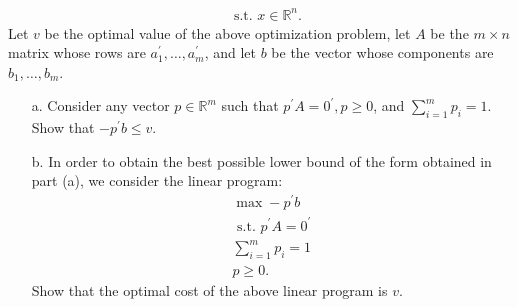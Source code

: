 \documentclass{article}
\begin{document}
\begin{jacklist}
\begin{framed}
\begin{align*}
            & \text { s.t. } x \in \mathbb{R}^{n} .
        \end{align*} Let $v$ be the optimal value of the above optimization problem, let $A$ be the $m \times n$ matrix whose 
        rows are $a_{1}^{\prime}, \ldots, a_{m}^{\prime}$, and let $b$ be the vector whose components are $b_{1}, \ldots, b_{m}$.
        \begin{itemize}
            \item [a.] Consider any vector $p \in \mathbb{R}^{m}$ such that $p^{\prime} A=0^{\prime}, p \geq 0$, and 
                $\sum_{i=1}^{m} p_{i}=1$. Show that $-p^{\prime} b \leq v$.
            \item [b.] In order to obtain the best possible lower bound of the form obtained in part (a), we consider the linear program:
                \begin{align*}
                    \max -p^{\prime} b \\
                    \text { s.t. } p^{\prime} A=0^{\prime} \\
                    \sum_{i=1}^{m} p_{i}=1 \\
                    p \geq 0.
                \end{align*} 
                Show that the optimal cost of the above linear program is $v$. 
        \end{itemize}
    \end{framed}
\end{jacklist}
\end{document}
